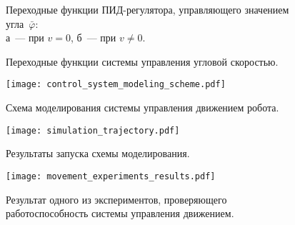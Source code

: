\begin{figure}[h!]
    \caption{Переходные функции ПИД-регулятора, управляющего значением угла~$\bar{\varphi}$:\\ а~--- при $v = 0$, б~--- при $v \ne 0$.}
    \label{img_phi_pid}
\end{figure}

\begin{figure}[h!]
    \vspace{0.0cm}
    \caption{Переходные функции системы управления угловой скоростью.}
    \label{img_angular_speed_feedworward}
\end{figure}

\begin{figure}[h!]
    \centering
    \texttt{[image: control\_system\_modeling\_scheme.pdf]}
    \vspace{0.0cm}
    \caption{Схема моделирования системы управления движением робота.}
    \label{img_control_system_modeling_scheme}
\end{figure}

\begin{figure}[h!]
    \centering
    \texttt{[image: simulation\_trajectory.pdf]}
    \vspace{0.0cm}
    \caption{Результаты запуска схемы моделирования.}
    \label{img_simulation_trajectory}
\end{figure}

\begin{figure}[h!]
    \centering
    \texttt{[image: movement\_experiments\_results.pdf]}
    \vspace{0.0cm}
    \caption{Результат одного из экспериментов, проверяющего работоспособность системы управления движением.}
    \label{img_movement_experiments_results}
\end{figure}

\newpage \mbox{} \newpage \mbox{} \newpage \mbox{} \newpage